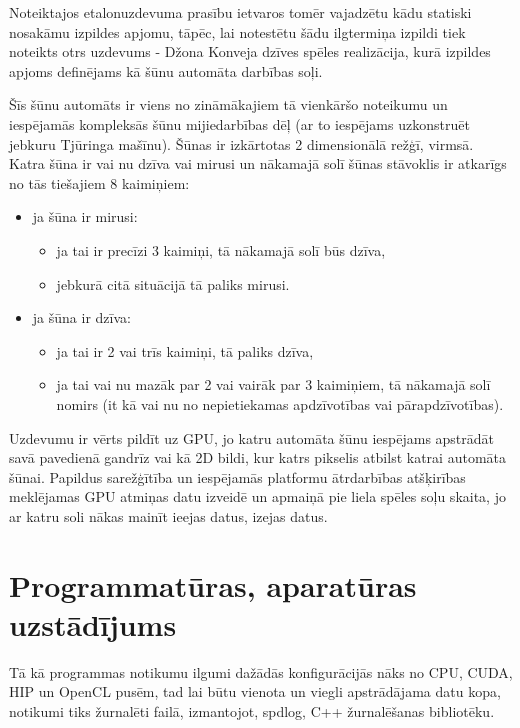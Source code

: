 Noteiktajos etalonuzdevuma prasību ietvaros tomēr vajadzētu kādu statiski
nosakāmu izpildes apjomu, tāpēc, lai notestētu šādu ilgtermiņa izpildi tiek
noteikts otrs uzdevums - Džona Konveja dzīves spēles \cite{conway1970conway}
realizācija, kurā izpildes apjoms definējams kā šūnu automāta darbības soļi.

Šīs šūnu automāts ir viens no zināmākajiem tā vienkāršo noteikumu un
iespējamās kompleksās šūnu mijiedarbības dēļ (ar to iespējams
uzkonstruēt jebkuru Tjūringa mašīnu). Šūnas ir izkārtotas 2 dimensionālā režģī,
virmsā. Katra šūna ir vai nu dzīva vai mirusi un nākamajā solī šūnas stāvoklis
ir atkarīgs no tās tiešajiem 8 kaimiņiem\cite{conway1970conway}:
\begin{itemize}
    \item ja šūna ir mirusi:
        \begin{itemize}
            \item ja tai ir precīzi 3 kaimiņi, tā nākamajā solī būs dzīva,
            \item jebkurā citā situācijā tā paliks mirusi.
        \end{itemize}
    \item ja šūna ir dzīva:
        \begin{itemize}
            \item ja tai ir 2 vai trīs kaimiņi, tā paliks dzīva,
            \item ja tai vai nu mazāk par 2 vai vairāk par 3 kaimiņiem,
                tā nākamajā solī nomirs (it kā vai nu no nepietiekamas
                apdzīvotības vai pārapdzīvotības).
        \end{itemize}
\end{itemize}

Uzdevumu ir vērts pildīt uz GPU, jo katru automāta šūnu iespējams apstrādāt
savā pavedienā gandrīz vai kā 2D bildi, kur katrs pikselis atbilst katrai
automāta šūnai. Papildus sarežģītība un iespējamās platformu ātrdarbības
atšķirības meklējamas GPU atmiņas datu izveidē un apmaiņā pie liela spēles soļu
skaita, jo ar katru soli nākas mainīt ieejas datus, izejas datus.


\section{Programmatūras, aparatūras uzstādījums}
Tā kā programmas notikumu ilgumi dažādās konfigurācijās nāks no CPU, CUDA, HIP
un OpenCL pusēm, tad lai būtu vienota un viegli apstrādājama datu kopa,
notikumi tiks žurnalēti failā, izmantojot, spdlog\cite{spdlog-github}, C++
žurnalēšanas bibliotēku.

